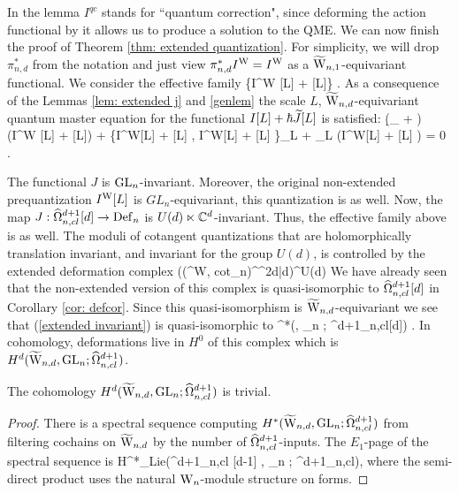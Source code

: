In the lemma $I^{qc}$ stands for ``quantum correction", since deforming the action functional by it allows us to produce a solution to the QME.
We can now finish the proof of Theorem \ref{thm: extended quantization}.
For simplicity, we will drop $\pi_{n,d}^*$ from the notation and just view $\pi^*_{n,d} I^{\rm W} = I^{\rm W}$ as a $\TVect$-equivariant functional. 
We consider the effective family 
\ben
\{I^{\rm W} [L] + \hbar {}[L]\} .
\een
As a consequence of the Lemmas \ref{lem: extended j} and \ref{genlem} the scale $L$, $\TVectd$-equivariant quantum master equation for the functional $I[L] + \hbar \Tilde{J}[L]$ is satisfied:
\ben
(\d_{} + \dbar) (I^{\rm W} [L] + \hbar {}[L]) + 
\{I^{\rm W}[L] + \hbar {}[L] , I^{\rm W}[L] + \hbar
{}[L] \}_L + \hbar \Delta_L (I^{\rm W}[L] + \hbar {}[L] ) = 0 .
\een 

The functional $J$ is $\GL_n$-invariant.
Moreover, the original non-extended prequantization $I^{\rm W}[L]$ is $GL_n$-equivariant, this quantization is as well.
Now, the map $J : \hOmega^{d+1}_{n,cl}[d] \to \Def_n$ is $U(d) \ltimes \CC^d$-invariant.
Thus, the effective family above is as well. 
The moduli of cotangent quantizations that are holomorphically translation invariant, and invariant for the group $U(d)$, is controlled by the extended deformation complex 
\be\label{extended invariant}
\left(\left(\Tilde{\Def}^{\rm W, cot}_n\right)^{\CC^{2d|d}}\right)^{U(d)}
\ee
We have already seen that the non-extended version of this complex is quasi-isomorphic to $\hOmega^{d+1}_{n,cl}[d]$ in Corollary \ref{cor: defcor}.
Since this quasi-isomorphism is $\TVectd$-equivariant we see that (\ref{extended invariant}) is quasi-isomorphic to 
\ben
\clie^*(\TVectd , \GL_n ; \hOmega^{d+1}_{n,cl}[d]) .
\een
In cohomology, deformations live in $H^0$ of this complex which is $H^{d}(\TVectd , \GL_n ; \hOmega^{d+1}_{n,cl})$.

\begin{lem}
The cohomology $H^{d}(\TVectd , \GL_n ; \hOmega^{d+1}_{n,cl})$ is trivial.
\end{lem}
\begin{proof}
There is a spectral sequence computing $H^{*}(\TVectd , \GL_n ; \hOmega^{d+1}_{n,cl})$ from filtering cochains on $\TVectd$ by the number of $\hOmega^{d+1}_{n,cl}$-inputs.
The $E_1$-page of the spectral sequence is 
\ben
H^{*}_{\rm Lie}(\Vect \ltimes \hOmega^{d+1}_{n,cl} [d-1] , \GL_n ; \hOmega^{d+1}_{n,cl}),
\een
where the semi-direct product uses the natural $\Vect$-module structure on forms.

\end{proof}

